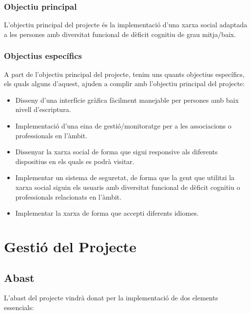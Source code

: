 \documentclass[11pt,catalan,listoffigures,listoftables]{tfgetsinf}
\begin{document}
\subsection{Objectiu principal}

L’objectiu principal del projecte és la implementació d’una xarxa social adaptada a les persones amb diversitat funcional de dèficit cognitiu de grau mitja/baix.

\subsection{Objectius específics}

A part de l’objectiu principal del projecte, tenim uns quants objectius específics, els quals alguns d’aquest, ajuden a complir amb l’objectiu principal del projecte:

\begin{itemize}
	\item Disseny d’una interfície gràfica fàcilment manejable per persones amb baix nivell d’escriptura.
	\item Implementació d’una eina de gestió/monitoratge per a les associacions o professionals en l’àmbit.
	\item Dissenyar la xarxa social de forma que sigui responsive als diferents dispositius en els quals es podrà visitar.
	\item Implementar un sistema de seguretat, de forma que la gent que utilitzi la xarxa social siguin els usuaris amb diversitat funcional de dèficit cognitiu o professionals relacionats en l’àmbit.
	\item Implementar la xarxa de forma que accepti diferents idiomes.
\end{itemize}

\chapter{Gestió del Projecte}

\section{Abast}

L’abast del projecte vindrà donat per la implementació de dos elements essencials:
\end{document}
